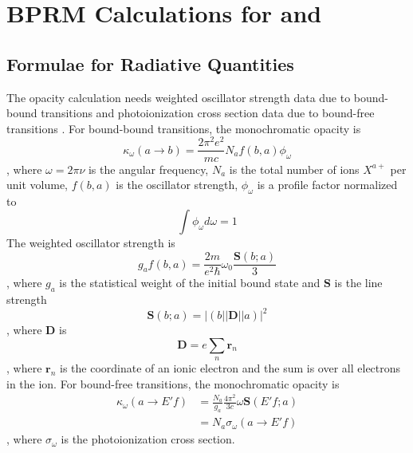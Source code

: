 \chapter{BPRM Calculations for  and }
\label{chap_bprm_fe17_fe18}

\section{Formulae for Radiative Quantities}
The opacity calculation needs weighted oscillator strength data due to bound-bound transitions and photoionization cross section data due to bound-free transitions \citep{opcd_1}. For bound-bound transitions, the monochromatic opacity is 
\begin{equation}
	\kappa_\omega (a \to b) = \frac{2\pi^2e^2}{mc} N_af(b, a)\phi_\omega
\end{equation}
, where $\omega = 2\pi \nu$ is the angular frequency, $N_a$ is the total number of ions $X^{a+}$ per unit volume, $f(b, a)$ is the oscillator strength, $\phi_\omega$ is a profile factor normalized to
\begin{equation}
	\int \phi_\omega d\omega = 1
\end{equation}
The weighted oscillator strength is 
\begin{equation}
	g_af(b,a) = \frac{2m}{e^2\hbar} \omega_0\frac{\mathbf{S}(b; a)}{3}
\end{equation}
, where $g_a$ is the statistical weight of the initial bound state and $\textbf{S}$ is the line strength
\begin{equation}
	\mathbf{S}(b; a) = | (b||\mathbf{D}||a) |^2
\end{equation}
, where $\mathbf{D}$ is 
\begin{equation}
	\mathbf{D} = e \sum_n \mathbf{r}_n
\end{equation}
, where $\mathbf{r}_n$ is the coordinate of an ionic electron and the sum is over all electrons in the ion.
For bound-free transitions, the monochromatic opacity is
\begin{align}
	\kappa_\omega (a \to E'f) &= \frac{N_a}{g_a} \frac{4\pi^2}{3c} \omega \mathbf{S}(E'f; a) \\
	 & = N_a \sigma_\omega(a \to E'f)
\end{align}
, where $\sigma_\omega$ is the photoionization cross section.



